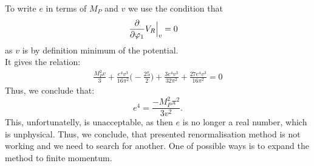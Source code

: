To write $e$ in terms of $M_P$ and $v$ we use the condition that 
\begin{align}
\frac{\partial }{\partial \varphi_1}V_R\Big|_{v} &= 0 
\end{align}
as $v$ is by definition minimum of the potential. \\
It gives the relation:
\begin{align}
\frac{M_P^2v}{3}+\frac{e^4v^3}{16\pi^2}\Big(-\frac{25}{2}\Big)+\frac{3e^4v^3}{32\pi^2}+
\frac{27e^4v^3}{16\pi^2} = 0
\end{align}
Thus, we conclude that: 
\begin{equation}
e^4=\frac{-M_P^2\pi^2}{3v^2}.
\end{equation}
This, unfortunatelly, is unacceptable, as then $e$ is no longer a real number, which is 
unphysical.
Thus, we conclude, that presented renormalisation method is not working and we need to search for 
another. One of possible ways is to expand the method to finite momentum. \\

